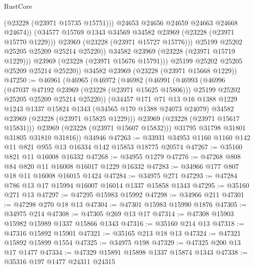 \begin{lexlean}{RustCore}
\begin{coremodule}
                        (@23228 (@23971 @15735 @15751)))
                      @24653
                      @24656
                      @24659
                      @24663
                      @24668
                      @24674))
                  (@34577 @15769 @1343 @34569 @34582 @23969 (@23228 (@23971 @15770 @1229)))
                  @23969
                  (@23228 (@23971 @15727 @15776)))
                @25199
                @25202
                @25205
                @25209
                @25214
                @25220))
            @34582
            @23969
            (@23228 (@23971 @15719 @1229)))
          @23969
          (@23228 (@23971 @15676 @15791)))
        @25199
        @25202
        @25205
        @25209
        @25214
        @25220))
    @34582
    @23969
    (@23228 (@23971 @15668 @1229))
@47250 := @46961
    (@46965
      (@46972
        (@46982
          (@46991
            (@46993
              (@46996
                (@47037 @47192 @23969 (@23228 (@23971 @15625 @15806)))
                @25199
                @25202
                @25205
                @25209
                @25214
                @25220))
            (@34457
              @171
              @71
              @13
              @16
              @1388
              @1229
              @1243
              @1337
              @15824
              @1343
              (@34565 @170 @1388 @24073 @24079)
              @34582
              @23969
              (@23228 (@23971 @15825 @1229)))
            @23969
            (@23228 (@23971 @15617 @15831)))
          @23969
          (@23228 (@23971 @15607 @15832)))
        @31795
        @31798
        @31801
        @31805
        @31810
        @31816))
    @34946
@47263 := @33931 @34953 @1160 @1160 @142 @11 @821 @955 @13 @16334 @142 @15853 @18775 @20574
@47267 := @35160 @821 @11 @16008 @16332
@47268 := @34955 @1279
@47276 := @47268 @808 @84 @820 @11 @16008 @16017 @1229 @16332
@47283 := @34966 @177 @807 @18 @11 @16008 @16015 @1424
@47284 := @34975 @271
@47293 := @47284 @786 @13 @17 @15994 @16007 @16014 @1337 @15858 @1343
@47295 := @35160 @271 @13
@47297 := @47295 @15983 @15992
@47298 := @34966 @211
@47301 := @47298 @270 @18 @13
@47304 := @47301 @15983 @15990 @1876
@47305 := @34975 @214
@47308 := @47305 @269 @13 @17
@47314 := @47308 @15903 @15982 @15989 @1337 @15866 @1343
@47316 := @35160 @214 @13
@47318 := @47316 @15892 @15901
@47321 := @35165 @213 @18 @13
@47324 := @47321 @15892 @15899 @1554
@47325 := @34975 @198
@47329 := @47325 @200 @13 @17 @1477
@47334 := @47329 @15891 @15898 @1337 @15874 @1343
@47338 := @35316 @197 @1477 @24311 @24315

\end{coremodule}
\end{lexlean}
